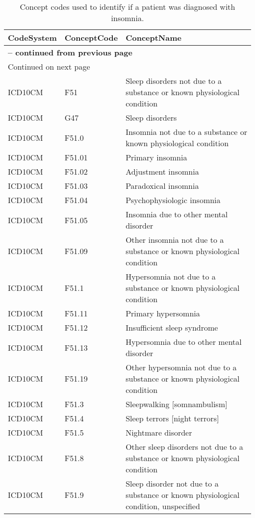\begin{longtable}{p{}p{}p{}}
\caption{Concept codes used to identify if a patient was diagnosed with insomnia.} \\ 
 CodeSystem & ConceptCode & ConceptName \\ 
  \hline 
\endfirsthead 
\multicolumn{3}{p{\textwidth}}{{ \bfseries \tablename \thetable{} -- continued from previous page}} \ 
\hline CodeSystem & ConceptCode & ConceptName \\ \hline 
\endhead 
\hline \multicolumn{3}{p{\textwidth}}{{Continued on next page}} \\ \hline 
\endfoot 
\hline 
\endlastfoot 
 \hline
ICD10CM & F51 & Sleep disorders not due to a substance or known physiological condition \\ 
  ICD10CM & G47 & Sleep disorders \\ 
  ICD10CM & F51.0 & Insomnia not due to a substance or known physiological condition \\ 
  ICD10CM & F51.01 & Primary insomnia \\ 
  ICD10CM & F51.02 & Adjustment insomnia \\ 
  ICD10CM & F51.03 & Paradoxical insomnia \\ 
  ICD10CM & F51.04 & Psychophysiologic insomnia \\ 
  ICD10CM & F51.05 & Insomnia due to other mental disorder \\ 
  ICD10CM & F51.09 & Other insomnia not due to a substance or known physiological condition \\ 
  ICD10CM & F51.1 & Hypersomnia not due to a substance or known physiological condition \\ 
  ICD10CM & F51.11 & Primary hypersomnia \\ 
  ICD10CM & F51.12 & Insufficient sleep syndrome \\ 
  ICD10CM & F51.13 & Hypersomnia due to other mental disorder \\ 
  ICD10CM & F51.19 & Other hypersomnia not due to a substance or known physiological condition \\ 
  ICD10CM & F51.3 & Sleepwalking [somnambulism] \\ 
  ICD10CM & F51.4 & Sleep terrors [night terrors] \\ 
  ICD10CM & F51.5 & Nightmare disorder \\ 
  ICD10CM & F51.8 & Other sleep disorders not due to a substance or known physiological condition \\ 
  ICD10CM & F51.9 & Sleep disorder not due to a substance or known physiological condition, unspecified \\ 

\end{longtable}
